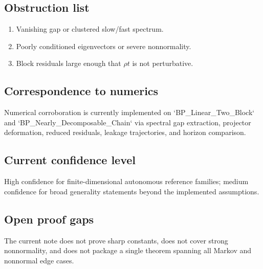 \subsection{Obstruction list}
\begin{enumerate}
\item Vanishing gap or clustered slow/fast spectrum.
\item Poorly conditioned eigenvectors or severe nonnormality.
\item Block residuals large enough that $\rho t$ is not perturbative.
\end{enumerate}

\subsection{Correspondence to numerics}
Numerical corroboration is currently implemented on `BP_Linear_Two_Block` and `BP_Nearly_Decomposable_Chain` via spectral gap extraction, projector deformation, reduced residuals, leakage trajectories, and horizon comparison.

\subsection{Current confidence level}
High confidence for finite-dimensional autonomous reference families; medium confidence for broad generality statements beyond the implemented assumptions.

\subsection{Open proof gaps}
The current note does not prove sharp constants, does not cover strong nonnormality, and does not package a single theorem spanning all Markov and nonnormal edge cases.
